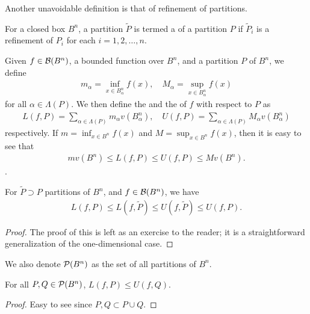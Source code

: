 Another unavoidable definition is that of refinement of partitions.

\begin{definition}
    For a closed box $B^{n}$, a partition $\tilde{P}$ is termed a  of a partition $P$ if $\tilde{P}_{i}$ is a refinement of $P_{i}$ for each $i = 1,2,\ldots,n$.
\end{definition}

Given $f \in \mathcal{B}(B^{n})$, a bounded function over $B^{n}$, and a partition $P$ of $B^{n}$, we define 
\begin{align}
    m_{\alpha} = \inf_{x \in B_{\alpha}^{n}} f(x), \quad M_{\alpha} = \sup_{x \in B_{\alpha}^{n}} f(x)
\end{align}
for all $\alpha \in \Lambda(P)$. We then define the  and the  of $f$ with respect to $P$ as
\begin{align}
    L(f,P) = \sum_{\alpha \in \Lambda(P)} m_{\alpha} v(B_{\alpha}^{n}), \quad U(f,P) = \sum_{\alpha \in \Lambda(P)} M_{\alpha} v(B_{\alpha}^{n})
\end{align}
respectively. If $m = \inf_{x \in B^{n}} f(x)$ and $M = \sup_{x \in B^{n}} f(x)$, then it is easy to see that
\begin{align}
    m v(B^{n}) \leq L(f,P) \leq U(f,P) \leq M v(B^{n}).
\end{align}.

\begin{theorem}
    For $\tilde{P} \supset P$ partitions of $B^{n}$, and $f \in \mathcal{B}(B^{n})$, we have
    \begin{align}
        L(f,P) \leq L(f,\tilde{P}) \leq U(f,\tilde{P}) \leq U(f,P).
    \end{align}
\end{theorem}
\begin{proof}
    The proof of this is left as an exercise to the reader; it is a straightforward generalization of the one-dimensional case.
\end{proof}
We also denote $\mathcal{P}(B^{n})$ as the set of all partitions of $B^{n}$.
\begin{corollary}
    For all $P,Q \in \mathcal{P}(B^{n})$, $L(f,P) \leq U(f,Q)$.
\end{corollary}
\begin{proof}
    Easy to see since $P,Q \subset P \cup Q$.
\end{proof}

